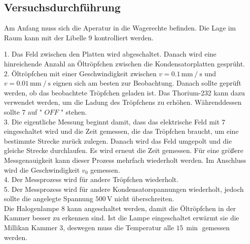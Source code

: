 \subsection{Versuchsdurchführung}
Am Anfang muss sich die Aperatur in die Wagerechte befinden. Die Lage im Raum kann mit der Libelle $9$ kontrolliert werden.

1. Das Feld zwischen den Platten wird abgeschaltet. Danach wird eine hinreichende Anzahl an Öltröpfchen zwischen die Kondensatorplatten gesprüht. \\

2. Öltröpfchen mit einer Geschwindigkeit zwischen $v = 0.1 \, \unit{\milli\meter} \mathbin{/} \unit{\second}$ und $v = 0.01 \, \unit{\milli\meter} \mathbin{/} \unit{\second}$ eignen sich am besten zur Beobachtung.
Danach sollte geprüft werden, ob das beobachtete Tröpfchen geladen ist. Das Thorium-232 kann dazu verwendet werden, um die Ladung des Tröpfchens zu erhöhen. Währenddessen sollte $7$ auf " $OFF$ " stehen. \\

3. Die eigentliche Messung beginnt damit, dass das elektrische Feld mit $7$ eingeschaltet wird und die Zeit gemessen, die das Tröpfchen braucht, um eine bestimmte Strecke zurück zulegen.
Danach wird das Feld umgepolt und die gleiche Strecke durchlaufen. Es wird erneut die Zeit gemessen. Für eine größere Messgenauigkeit kann dieser Prozess mehrfach wiederholt werden.
Im Anschluss wird die Geschwindigkeit $v_0$ gemessen. \\

4. Der Messprozess wird für andere Tröpfchen wiederholt.\\

5. Der Messprozess wird für andere Kondensatorspannungen wiederholt, jedoch sollte die angelegte Spannung $500 \, \unit{\volt}$ nicht überschreiten.\\

Die Halogenlampe $8$ kann angeschaltet werden, damit die Öltröpfchen in der Kammer besser zu erkennen sind.
Ist die Lampe eingeschaltet erwärmt sie die Millikan Kammer $3$, deswegen muss die Temperatur alle $15 \, \unit{\min}$ gemessen werden.
